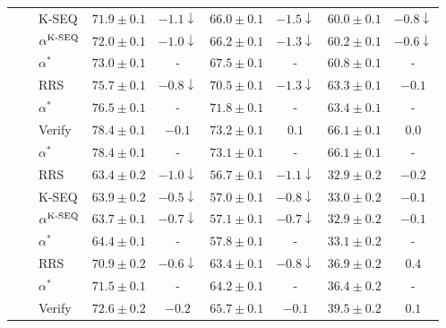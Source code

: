 \documentclass{article}
\begin{document}
\begin{table}[ht]
{\begin{tabular}{lllcccccc}
 &  & K-SEQ & $71.9 \pm 0.1$ & $-1.1\downarrow$ & $66.0 \pm 0.1$ & $-1.5\downarrow$ & $60.0 \pm 0.1$ & $-0.8\downarrow$ \\
 &  & $\alpha^{\operatorname{K-SEQ}}$ & $72.0 \pm 0.1$ & $-1.0\downarrow$ & $66.2 \pm 0.1$ & $-1.3\downarrow$ & $60.2 \pm 0.1$ & $-0.6\downarrow$ \\
 &  & $\alpha^\ast$ & $\bm{73.0} \pm 0.1$ & - & $\bm{67.5} \pm 0.1$ & - & $\bm{60.8} \pm 0.1$ & - \\
\cmidrule(r){2-9} &  & RRS & $75.7 \pm 0.1$ & $-0.8\downarrow$ & $70.5 \pm 0.1$ & $-1.3\downarrow$ & $\bm{63.3} \pm 0.1$ & $-0.1$ \\
 &  & $\alpha^\ast$ & $\bm{76.5} \pm 0.1$ & - & $\bm{71.8} \pm 0.1$ & - & $\bm{63.4} \pm 0.1$ & - \\
\cmidrule(r){2-9} &  & Verify & $\bm{78.4} \pm 0.1$ & $-0.1$ & $\bm{73.2} \pm 0.1$ & $0.1$ & $\bm{66.1} \pm 0.1$ & $0.0$ \\
 &  & $\alpha^\ast$ & $\bm{78.4} \pm 0.1$ & - & $\bm{73.1} \pm 0.1$ & - & $\bm{66.1} \pm 0.1$ & - \\
\midrule
{} &  & RRS & $63.4 \pm 0.2$ & $-1.0\downarrow$ & $56.7 \pm 0.1$ & $-1.1\downarrow$ & $\bm{32.9} \pm 0.2$ & $-0.2$ \\
 &  & K-SEQ & $63.9 \pm 0.2$ & $-0.5\downarrow$ & $57.0 \pm 0.1$ & $-0.8\downarrow$ & $\bm{33.0} \pm 0.2$ & $-0.1$ \\
 &  & $\alpha^{\operatorname{K-SEQ}}$ & $63.7 \pm 0.1$ & $-0.7\downarrow$ & $57.1 \pm 0.1$ & $-0.7\downarrow$ & $\bm{32.9} \pm 0.2$ & $-0.1$ \\
 &  & $\alpha^\ast$ & $\bm{64.4} \pm 0.1$ & - & $\bm{57.8} \pm 0.1$ & - & $\bm{33.1} \pm 0.2$ & - \\
\cmidrule(r){2-9} &  & RRS & $70.9 \pm 0.2$ & $-0.6\downarrow$ & $63.4 \pm 0.1$ & $-0.8\downarrow$ & $\bm{36.9} \pm 0.2$ & $0.4$ \\
 &  & $\alpha^\ast$ & $\bm{71.5} \pm 0.1$ & - & $\bm{64.2} \pm 0.1$ & - & $\bm{36.4} \pm 0.2$ & - \\
\cmidrule(r){2-9} &  & Verify & $\bm{72.6} \pm 0.2$ & $-0.2$ & $\bm{65.7} \pm 0.1$ & $-0.1$ & $\bm{39.5} \pm 0.2$ & $0.1$ \\

\end{tabular}}
\end{table}
\end{document}
